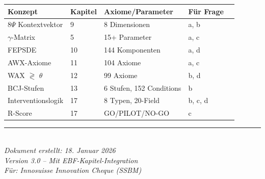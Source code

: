 \documentclass[11pt,a4paper]{article}
\begin{document}
\begin{center}
\begin{tabular}{lllll}
\toprule
\textbf{Konzept} & \textbf{Kapitel} & \textbf{Axiome/Parameter} & \textbf{Für Frage} \\
\midrule
8$\Psi$ Kontextvektor & 9 & 8 Dimensionen & a, b \\
$\gamma$-Matrix & 5 & 15+ Parameter & a, c \\
FEPSDE & 10 & 144 Komponenten & a, d \\
AWX-Axiome & 11 & 104 Axiome & a, c \\
WAX $\gtrless$ $\theta$ & 12 & 99 Axiome & b, d \\
BCJ-Stufen & 13 & 6 Stufen, 152 Conditions & b \\
Interventionslogik & 17 & 8 Typen, 20-Field & b, c, d \\
R-Score & 17 & GO/PILOT/NO-GO & c \\
\bottomrule
\end{tabular}
\end{center}

\vfill

\begin{center}
\textcolor{innogray}{\rule{0.8\textwidth}{0.4pt}}\\[0.5em]
\textit{Dokument erstellt: 18. Januar 2026}\\
\textit{Version 3.0 -- Mit EBF-Kapitel-Integration}\\
\textit{Für: Innosuisse Innovation Cheque (SSBM)}
\end{center}
\end{document}
